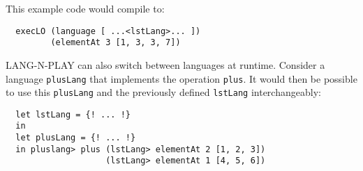 This example code would compile to:

\begin{lstlisting}
  execLO (language [ ...<lstLang>... ]) 
         (elementAt 3 [1, 3, 3, 7])
\end{lstlisting}

LANG-N-PLAY can also switch between languages at runtime. Consider a language \lstinline|plusLang| that implements the operation \lstinline|plus|. It would then be possible to use this \lstinline|plusLang| and the previously defined \lstinline|lstLang| interchangeably:

\begin{lstlisting}
  let lstLang = {! ... !}
  in 
  let plusLang = {! ... !}
  in pluslang> plus (lstLang> elementAt 2 [1, 2, 3]) 
                    (lstLang> elementAt 1 [4, 5, 6])
\end{lstlisting}